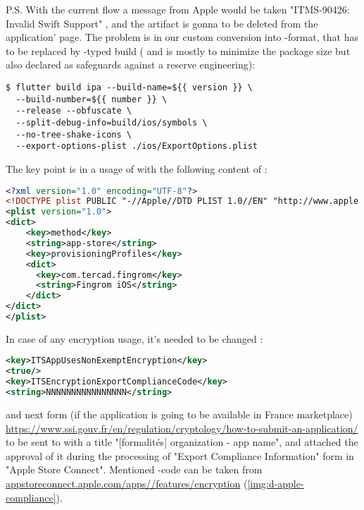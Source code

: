 
\noindent P.S. With the current flow a message from Apple would be taken "ITMS-90426: Invalid Swift Support" ,
and the artifact is gonna to be deleted from the application' page. The problem is in our custom conversion into 
-format, that has to be replaced by -typed build ( and  is mostly to 
minimize the package size but also declared as safeguards against a reserve engineering):

\begin{lstlisting}[language=terminal]
$ flutter build ipa --build-name=${{ version }} \
  --build-number=${{ number }} \
  --release --obfuscate \
  --split-debug-info=build/ios/symbols \
  --no-tree-shake-icons \
  --export-options-plist ./ios/ExportOptions.plist
\end{lstlisting}

\noindent The key point is in a usage of  with the following content of :

\begin{lstlisting}[language=xml]
<?xml version="1.0" encoding="UTF-8"?>
<!DOCTYPE plist PUBLIC "-//Apple//DTD PLIST 1.0//EN" "http://www.apple.com/DTDs/PropertyList-1.0.dtd">
<plist version="1.0">
<dict>
    <key>method</key>
    <string>app-store</string>
    <key>provisioningProfiles</key>
    <dict>
      <key>com.tercad.fingrom</key>
      <string>Fingrom iOS</string>
    </dict>
</dict>
</plist>
\end{lstlisting}

\noindent In case of any encryption usage, it's needed to be changed :

\begin{lstlisting}[language=xml]
<key>ITSAppUsesNonExemptEncryption</key>
<true/>
<key>ITSEncryptionExportComplianceCode</key>
<string>NNNNNNNNNNNNNNNN</string>
\end{lstlisting}

\noindent and next form (if the application is going to be available in France marketplace) 
\href{https://www.ssi.gouv.fr/en/regulation/cryptology/how-to-submit-an-application/}{https://www.ssi.gouv.fr/en/regulation/cryptology/how-to-submit-an-application/}
to be sent to  with a title "[formalités] {organization} - {app name}", and attached the approval 
of it during the processing of "Export Compliance Information" form in "Apple Store Connect". Mentioned 
-code can be taken from 
\href{https://appstoreconnect.apple.com/apps}{appstoreconnect.apple.com/apps/\q{id}/features/encryption}
(\cref{img:d-apple-compliance}).

